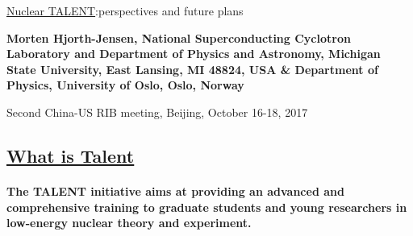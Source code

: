 \documentclass[%
oneside,                 %
final,                   %
10pt]{article}
\begin{document}

\newcommand{\exercisesection}[1]{\subsection*{#1}}






\thispagestyle{empty}

\begin{center}
{\LARGE\bf
\begin{spacing}{1.25}
\href{{http://www.nucleartalent.org}}{Nuclear TALENT}:perspectives and future plans
\end{spacing}
}
\end{center}


\begin{center}
{\bf Morten Hjorth-Jensen, National Superconducting Cyclotron Laboratory and Department of Physics and Astronomy, Michigan State University, East Lansing, MI 48824, USA {\&} Department of Physics, University of Oslo, Oslo, Norway${}^{}$} \\ [0mm]
\end{center}

\begin{center}
\end{center}
    

\begin{center}
Second China-US RIB meeting, Beijing, October 16-18, 2017
\end{center}

\vspace{1cm}


\subsection*{\href{{http://www.nucleartalent.org}}{What is Talent}}

\paragraph{}
\textbf{The TALENT initiative aims at providing an advanced and comprehensive training to graduate students and young researchers in low-energy nuclear theory and experiment.}
\end{document}
